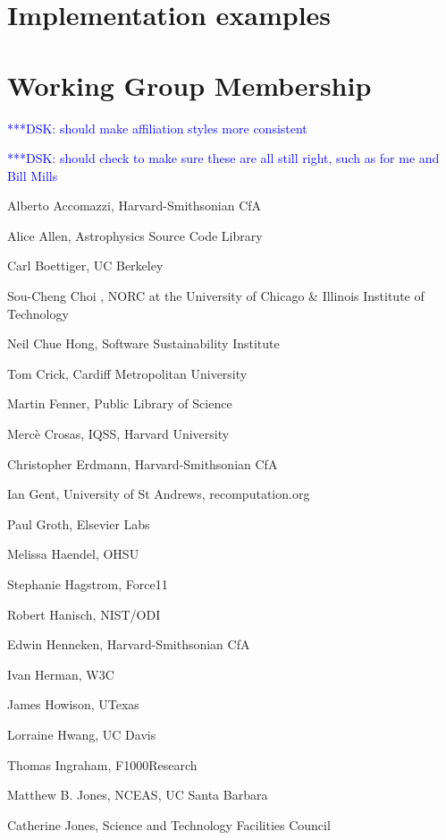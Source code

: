 \documentclass[11pt, oneside]{amsart}
\newcommand{\katznote}[1]{ {\textcolor{blue} { ***DSK: #1 }}}
\begin{document}
\section{Implementation examples}
\label{sec:examples}

\appendix

\section{Working Group Membership}
\label{app:wg_members}

\katznote{should make affiliation styles more consistent}

\katznote{should check to make sure these are all still right, such as for me and Bill Mills}

Alberto Accomazzi, Harvard-Smithsonian CfA

Alice Allen, Astrophysics Source Code Library

Carl Boettiger, UC Berkeley

Sou-Cheng Choi , NORC at the University of Chicago \& Illinois Institute of Technology	

Neil Chue Hong, Software Sustainability Institute	

Tom Crick, Cardiff Metropolitan University	

Martin Fenner, Public Library of Science	

Merc\`e Crosas, IQSS, Harvard University	

Christopher Erdmann, Harvard-Smithsonian CfA	

Ian Gent, University of St Andrews, recomputation.org	

Paul Groth, Elsevier Labs	

Melissa Haendel, OHSU	

Stephanie Hagstrom, Force11	

Robert Hanisch, NIST/ODI	

Edwin Henneken, Harvard-Smithsonian CfA	

Ivan Herman, W3C	

James Howison, UTexas	

Lorraine Hwang, UC Davis	

Thomas Ingraham, F1000Research	

Matthew B. Jones, NCEAS, UC Santa Barbara	

Catherine Jones, Science and Technology Facilities Council
\end{document}
